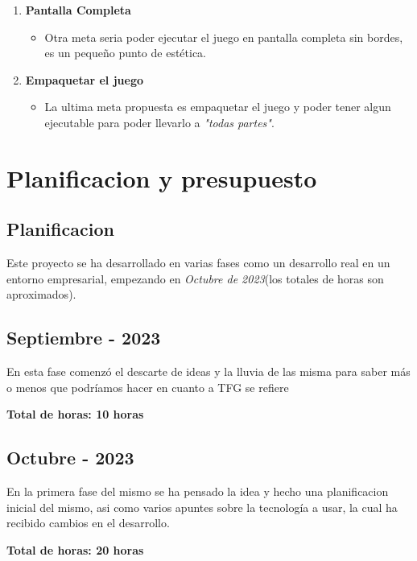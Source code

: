 \documentclass[a4paper]{article}
\begin{document}
\begin{enumerate}
    \item \textbf{Pantalla Completa}
          \begin{itemize}
              \item Otra meta seria poder ejecutar el juego en pantalla completa sin bordes, es un pequeño punto de estética.
          \end{itemize}

    \item \textbf{Empaquetar el juego}
          \begin{itemize}
              \item La ultima meta propuesta es empaquetar el juego y poder tener algun ejecutable para poder llevarlo a \textit{"todas partes"}.
          \end{itemize}
\end{enumerate}

\clearpage
\section{Planificacion y presupuesto}
\subsection{Planificacion}
Este proyecto se ha desarrollado en varias fases como un desarrollo real en un entorno empresarial, empezando en \textit{Octubre de 2023}(los totales de horas son aproximados).
\subsection{Septiembre - 2023}
En esta fase comenzó el descarte de ideas y la lluvia de las misma para saber más o menos que podríamos hacer en cuanto a TFG se refiere
\begin{flushright}
    \bf Total de horas: 10 horas
\end{flushright}

\subsection{Octubre - 2023}
En la primera fase del mismo se ha pensado la idea y hecho una planificacion inicial del mismo, asi como varios apuntes sobre la tecnología a usar, la cual ha recibido cambios en el desarrollo.
\begin{flushright}
    \bf Total de horas: 20 horas
\end{flushright}
\end{document}
